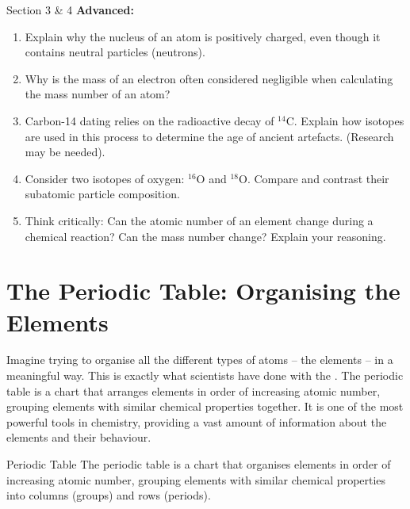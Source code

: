 \begin{tieredquestions}{Section 3 & 4}
\textbf{Advanced:}
\begin{enumerate}
    \item  Explain why the nucleus of an atom is positively charged, even though it contains neutral particles (neutrons).
    \item  Why is the mass of an electron often considered negligible when calculating the mass number of an atom?
    \item  Carbon-14 dating relies on the radioactive decay of $^{14}\text{C}$. Explain how isotopes are used in this process to determine the age of ancient artefacts. (Research may be needed).
    \item  Consider two isotopes of oxygen: $^{16}\text{O}$ and $^{18}\text{O}$. Compare and contrast their subatomic particle composition.
    \item  Think critically: Can the atomic number of an element change during a chemical reaction? Can the mass number change? Explain your reasoning.
\end{enumerate}

\end{tieredquestions}


\section{The Periodic Table: Organising the Elements}


Imagine trying to organise all the different types of atoms – the elements – in a meaningful way.  This is exactly what scientists have done with the .  The periodic table is a chart that arranges elements in order of increasing atomic number, grouping elements with similar chemical properties together. It is one of the most powerful tools in chemistry, providing a vast amount of information about the elements and their behaviour.

\begin{keyconcept}{Periodic Table}
The periodic table is a chart that organises elements in order of increasing atomic number, grouping elements with similar chemical properties into columns (groups) and rows (periods).
\end{keyconcept}

